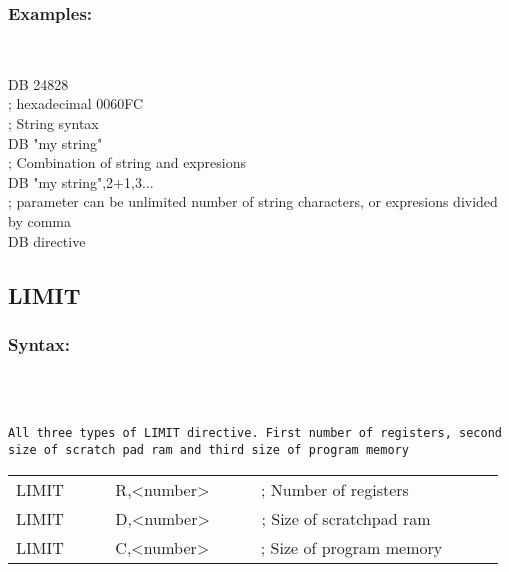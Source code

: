         \subsubsection{Examples:}\\
                \begin{code}[h!]
                        { \color{highlight_directive} DB }
                        { \color{highlight_symbol}   24828 }\\
                        { \color{highlight_comment} ; hexadecimal 0060FC}\\
                        { \color{highlight_comment} ; String syntax}\\
                        { \color{highlight_directive} DB }
                        { \color{highlight_symbol}   "my string"}\\
                        { \color{highlight_comment} ; Combination of string and expresions}\\
                        { \color{highlight_directive} DB }
                        { \color{highlight_symbol}   "my string",2+1,3...}\\
                        { \color{highlight_comment} ; parameter can be unlimited number of string characters, or expresions divided by comma}\\
                    \caption{DB directive}
                \end{code}

        \subsection{LIMIT}
        \subsubsection{Syntax:}\\
        \\ {
                \texttt{All three types of LIMIT directive. First number of registers, second size of scratch pad ram and third size of program memory}
                \begin{tabular}[h!]{llll}
                        { \color{highlight_directive} LIMIT }   \verb`     `
                        { \color{highlight_symbol} R,<number> }  \verb`     `   { \color{highlight_comment} ; Number of registers }\\
                        { \color{highlight_directive} LIMIT }   \verb`     `
                        { \color{highlight_symbol} D,<number> }  \verb`     `   { \color{highlight_comment} ; Size of scratchpad ram }\\
                        { \color{highlight_directive} LIMIT }  \verb`     `
                        { \color{highlight_symbol} C,<number> }  \verb`     `   { \color{highlight_comment} ; Size of program memory }
                \end{tabular}
            }\\
            \\
